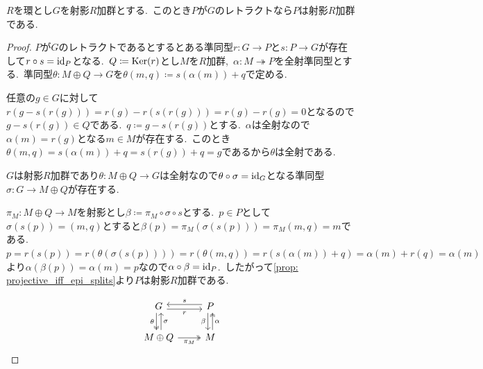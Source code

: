 \begin{lemma} \label{lem: projective_of_retract}
$R$を環とし$G$を射影$R$加群とする.\
このとき$P$が$G$のレトラクトなら$P$は射影$R$加群である.
\end{lemma}
\begin{proof}
$P$が$G$のレトラクトであるとするとある準同型$r \colon G \to P$と$s \colon P \to G$が存在して$r \circ s = \operatorname{id}_P$となる.\
$Q \coloneq \operatorname{Ker}(r)$とし$M$を$R$加群,\ $\alpha \colon M \twoheadrightarrow P$を全射準同型とする.\
準同型$\theta \colon M \oplus Q \to G$を$\theta(m,q) \coloneq s(\alpha(m)) + q$で定める.

任意の$g \in G$に対して$r(g - s(r(g))) = r(g) - r(s(r(g))) = r(g) - r(g) = 0$となるので$g - s(r(g)) \in Q$である.\
$q \coloneq g - s(r(g))$とする.\
$\alpha$は全射なので$\alpha(m) = r(g)$となる$m \in M$が存在する.\
このとき$\theta(m, q) = s(\alpha(m)) + q = s(r(g)) + q = g$であるから$\theta$は全射である.

$G$は射影$R$加群であり$\theta \colon M \oplus Q \to G$は全射なので$\theta \circ \sigma = \operatorname{id}_G$となる準同型$\sigma \colon G \to M \oplus Q$が存在する.

$\pi_M \colon M \oplus Q \to M$を射影とし$\beta \coloneq \pi_M \circ \sigma \circ s$とする.\
$p \in P$として$\sigma(s(p)) = (m,q)$とすると$\beta(p) = \pi_M(\sigma(s(p))) = \pi_M(m, q) = m$である.\
$p = r(s(p)) = r(\theta(\sigma(s(p)))) = r(\theta(m,q)) = r(s(\alpha(m)) + q) = \alpha(m) + r(q) = \alpha(m)$より$\alpha(\beta(p)) = \alpha(m) = p$なので$\alpha \circ \beta = \operatorname{id}_P$.\
したがって\cref{prop: projective_iff_epi_splits}より$P$は射影$R$加群である.

\[\begin{tikzcd}
	G & P \\
	{M \oplus Q} & M
	\arrow["r"', shift right, from=1-1, to=1-2]
	\arrow["\theta"', shift right, two heads, from=1-1, to=2-1]
	\arrow["s"', shift right, from=1-2, to=1-1]
	\arrow["\beta"', shift right, from=1-2, to=2-2]
	\arrow["\sigma"', shift right, from=2-1, to=1-1]
	\arrow["{\pi_M}"', two heads, from=2-1, to=2-2]
	\arrow["\alpha"', shift right, two heads, from=2-2, to=1-2]
\end{tikzcd}\]
\end{proof}

